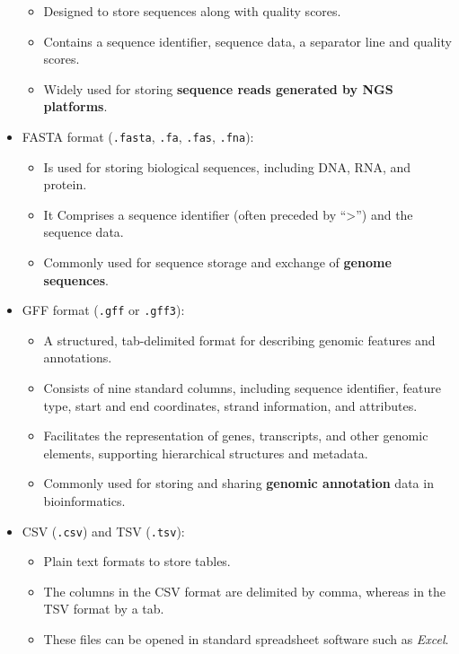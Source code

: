 \documentclass[
]{article}
\providecommand{\tightlist}{%
  \setlength{\itemsep}{0pt}\setlength{\parskip}{0pt}}
\begin{document}
\begin{itemize}
  \begin{itemize}
  \tightlist
  \item
    Designed to store sequences along with quality scores.
  \item
    Contains a sequence identifier, sequence data, a separator line and
    quality scores.
  \item
    Widely used for storing \textbf{sequence reads generated by NGS
    platforms}.
  \end{itemize}
\item
  FASTA format (\texttt{.fasta}, \texttt{.fa}, \texttt{.fas},
  \texttt{.fna}):

  \begin{itemize}
  \tightlist
  \item
    Is used for storing biological sequences, including DNA, RNA, and
    protein.
  \item
    It Comprises a sequence identifier (often preceded by
    ``\textgreater{}'') and the sequence data.
  \item
    Commonly used for sequence storage and exchange of \textbf{genome
    sequences}.
  \end{itemize}
\item
  GFF format (\texttt{.gff} or \texttt{.gff3}):

  \begin{itemize}
  \tightlist
  \item
    A structured, tab-delimited format for describing genomic features
    and annotations.
  \item
    Consists of nine standard columns, including sequence identifier,
    feature type, start and end coordinates, strand information, and
    attributes.
  \item
    Facilitates the representation of genes, transcripts, and other
    genomic elements, supporting hierarchical structures and metadata.
  \item
    Commonly used for storing and sharing \textbf{genomic annotation}
    data in bioinformatics.
  \end{itemize}
\item
  CSV (\texttt{.csv}) and TSV (\texttt{.tsv}):

  \begin{itemize}
  \tightlist
  \item
    Plain text formats to store tables.
  \item
    The columns in the CSV format are delimited by comma, whereas in the
    TSV format by a tab.
  \item
    These files can be opened in standard spreadsheet software such as
    \emph{Excel}.
  \end{itemize}
\end{itemize}
\end{document}
